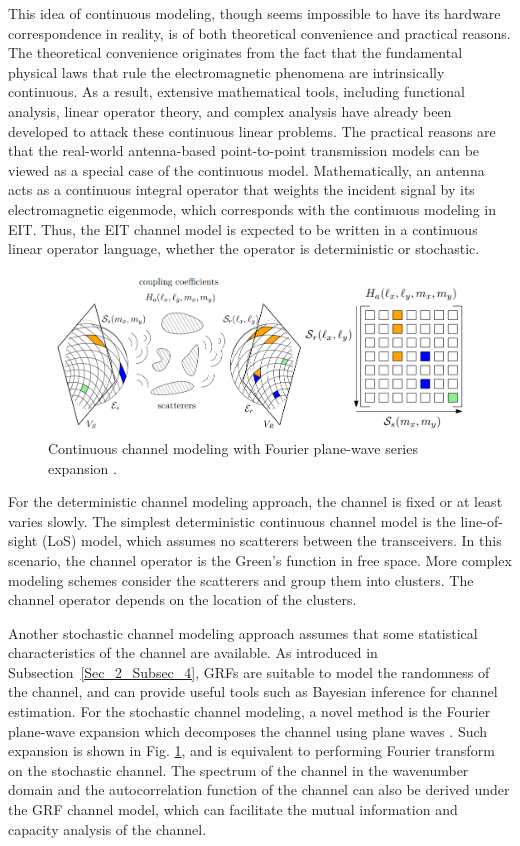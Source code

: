 \documentclass[journal,twocolumn]{IEEEtran}
\begin{document}
This idea of continuous modeling, though seems impossible to have its hardware correspondence in reality, is of both theoretical convenience and practical reasons. 
The theoretical convenience originates from the fact that the fundamental physical laws that rule the electromagnetic phenomena are intrinsically continuous. 
As a result, extensive mathematical tools, including functional analysis, linear operator theory, and complex analysis have already been developed to attack these continuous linear problems. 
The practical reasons are that the real-world antenna-based point-to-point transmission models can be viewed as a special case of the continuous model. 
Mathematically, an antenna acts as a continuous integral operator that weights the incident signal by its electromagnetic eigenmode, which corresponds with the continuous modeling in EIT. 
Thus, the EIT channel model is expected to be written in a continuous linear operator language, whether the operator is deterministic or stochastic.
\begin{figure}
	\centering 
	\includegraphics[width=\linewidth]{figures/random_channel.png} 
	\caption{Continuous channel modeling with Fourier plane-wave series expansion \cite{marzetta2022fourier}.} 
	\label{fig:marzetta}
\end{figure}

For the deterministic channel modeling approach, the channel is fixed or at least varies slowly. The simplest deterministic continuous channel model is the line-of-sight (LoS) model, which assumes no scatterers between the transceivers. In this scenario, the channel operator is the Green's function in free space. More complex modeling schemes consider the scatterers and group them into clusters. The channel operator depends on the location of the clusters.

Another stochastic channel modeling approach assumes that some statistical characteristics of the channel are available. As introduced in Subsection~\ref{Sec_2_Subsec_4}, GRFs are suitable to model the randomness of the channel, and can provide useful tools such as Bayesian inference for channel estimation. For the stochastic channel modeling, a novel method is the Fourier plane-wave expansion which decomposes the channel using plane waves \cite{marzetta2022fourier}. Such expansion is shown in Fig. \ref{fig:marzetta}, and is equivalent to performing Fourier transform on the stochastic channel. The spectrum of the channel in the wavenumber domain and the autocorrelation function of the channel can also be derived under the GRF channel model, which can facilitate the mutual information and capacity analysis of the channel.
\end{document}

